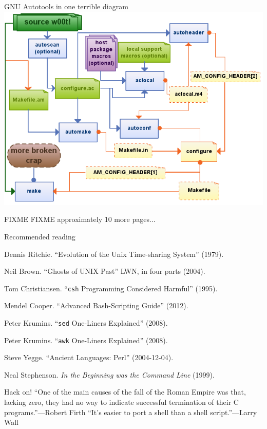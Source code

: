 \documentclass[mathserif,xcolor={dvipsnames,table}]{beamer}
\begin{document}
\begin{frame}{GNU Autotools in one terrible diagram}
\includegraphics[scale=0.45]{images/circleoflife.png}
\end{frame}

\begin{frame}{FIXME}
\huge FIXME approximately 10 more pages...
\end{frame}

\begin{frame}{Recommended reading}
\begin{itemize}
\small{
\item Dennis Ritchie. ``Evolution of the Unix Time-sharing System'' (1979).
\item Neil Brown. ``Ghosts of UNIX Past'' LWN, in four parts (2004).
\item Tom Christiansen. ``\texttt{csh} Programming Considered Harmful'' (1995).
\item Mendel Cooper. ``Advanced Bash-Scripting Guide'' (2012).
\item Peter Krumins. ``\texttt{sed} One-Liners Explained'' (2008).
\item Peter Krumins. ``\texttt{awk} One-Liners Explained'' (2008).
\item Steve Yegge. ``Ancient Languages: Perl'' (2004-12-04).
\item Neal Stephenson. \textit{In the Beginning was the Command Line} (1999).
}
\end{itemize}
\end{frame}

\begin{frame}{Hack on!}
``One of the main causes of the fall of the Roman Empire was that, lacking zero, they had no way to indicate successful termination of their C programs.''\hfill---Robert Firth
\vfill
``It's easier to port a shell than a shell script.''\hfill---Larry Wall
\end{frame}
\end{document}
